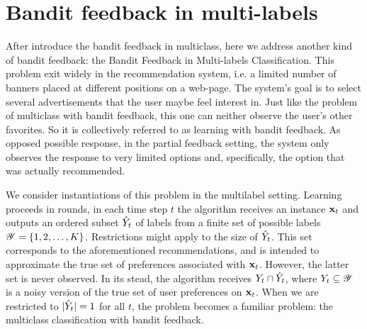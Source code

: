 \section{Bandit feedback in multi-labels}
\label{sec:BF02}

After introduce the bandit feedback in multiclass, here we address another kind of bandit feedback: the Bandit Feedback in Multi-labels Classification.  This problem exit widely in the recommendation system, i.e. a limited number of banners placed at different positions on a web-page. The system's goal is to select several advertisements that the user maybe feel interest in. Just like the problem of multiclass with bandit feedback, this one can neither observe the user's other favorites. So it is collectively referred  to as learning with bandit feedback. As opposed possible response, in the partial feedback setting, the system only observes the response to very limited options and, specifically, the option that was actually recommended. 

We consider instantiations of this problem in the multilabel setting. Learning proceeds in rounds, in each time step $t$ the algorithm receives an instance $\mathbf{x}_t$ and outputs an ordered subset $\hat{Y}_t$ of labels from a finite set of possible labels $\mathscr{Y}=\{1,2,\dots,K\}$. Restrictions might apply to the size of $\hat{Y}_t$. This set  corresponds to the aforementioned recommendations, and is intended to approximate the true set of preferences associated with $\mathbf{x}_t$. However, the latter set is never observed. In its stead, the algorithm receives $Y_t\cap\hat{Y}_t$, where $Y_t\subseteq\mathscr{Y}$ is a noisy version of the true set of user preferences on $\mathbf{x}_t$. When we are restricted to $|\hat{Y}_t| = 1$ for all $t$, the problem becomes a familiar problem: the multiclass classification with bandit feedback.  




